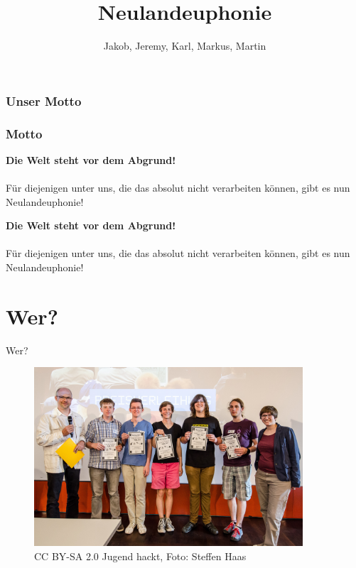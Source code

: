 \documentclass [xcolor=dvipsnames] {beamer}
\title {\sc Neulandeuphonie}
\author {Jakob, Jeremy, Karl, Markus, Martin}
\begin{document}
\begin{frame}
	\titlepage
\end{frame}


\subsubsection{Unser Motto}
\begin{frame}
	\frametitle{\sc Motto}
	\begin{center}
		{\bf Die Welt steht vor dem Abgrund!}\\ \ \\ Für diejenigen unter uns, die das absolut nicht verarbeiten können, gibt es nun Neulandeuphonie!
	\end{center}
\end{frame}
\note
{
	 {\bf Die Welt steht vor dem Abgrund!}\\ \ \\ Für diejenigen unter uns, die das absolut nicht verarbeiten können, gibt es nun Neulandeuphonie!
}

\section{Wer?}
\begin{frame}
	\begin{center}
		{\Huge Wer?}
	\end{center}
\end{frame}
\begin{frame}
	\begin{figure}
		\includegraphics[width=10cm]{jhost2015abschluss}
		\caption{CC BY-SA 2.0 Jugend hackt, Foto: Steffen Haas}
	\end{figure}
\end{frame}
\end{document}
